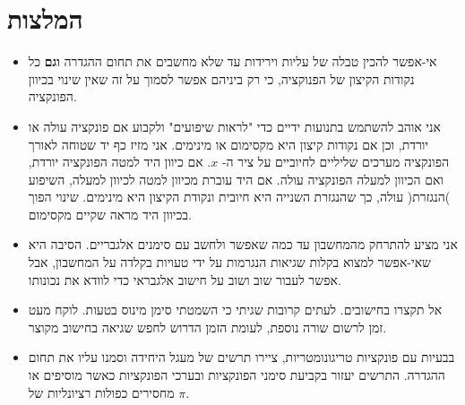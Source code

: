 

\section*{המלצות}


\begin{itemize}
\item
אי-אפשר להכין טבלה של עליות וירידות עד שלא מחשבים את תחום ההגדרה 
\textbf{וגם}
כל נקודות הקיצון של הפנוקציה, כי רק ביניהם אפשר לסמוך על זה שאין שינוי בכיוון הפונקציה.


\item
אני אוהב להשתמש בתנועות ידיים כדי "לראות שיפועים" ולקבוע אם פונקציה עולה או יורדת, וכן אם נקודות קיצון היא מקסימום או מינימים. אני מזיז כף יד שטוחה לאורך הפונקציה מערכים שליליים לחיוביים על ציר ה-%
$x$.
אם כיוון היד למטה הפונקציה יורדת, ואם הכיוון למעלה הפונקציה עולה. אם היד עוברת מכיוון למטה לכיוון למעלה, השיפוע )הנגזרת( עולה, כך שהנגזרת השנייה היא חיובית ונקודת הקיצון היא מינימים. שינוי הפוך בכיוון היד מראה שקיים מקסימום.

\item
אני מציע להתרחק מהמחשבון עד כמה שאפשר ולחשב עם סימנים אלגבריים. הסיבה היא שאי-אפשר למצוא בקלות שגיאות הנגרמות על ידי טעויות בקלדה על המחשבון, אבל אפשר לעבור שוב ושוב על חישוב אלגבראי כדי לוודא את נכונותו. 

\item
אל תקצרו בחישובים. לעתים קרובות שגיתי כי השמטתי סימן מינוס בטעות. לוקח מעט זמן לרשום שורה נוספת, לעומת הזמן הדרוש לחפש שגיאה בחישוב מקוצר.

\item
בבעיות עם פונקציות טריגונומטריות, ציירו תרשים של מעגל היחידה וסמנו עליו את תחום ההגדרה. התרשים יעזור בקביעת סימני הפונקציות ובערכי הפונקציות כאשר מוסיפים או מחסירים כפולות רציונליות של 
$\pi$.


\end{itemize}
